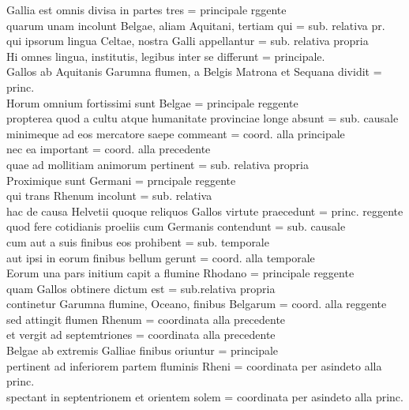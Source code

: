 \documentclass[10pt,a4paper]{article}
\begin{document}
	Gallia est omnis divisa in partes tres = principale rggente \\
	quarum unam incolunt Belgae, aliam Aquitani, tertiam qui = sub. relativa pr.\\
	qui ipsorum lingua Celtae, nostra Galli appellantur = sub. relativa propria\\
	Hi omnes lingua, institutis, legibus inter se differunt = principale.\\
	Gallos ab Aquitanis Garumna flumen, a Belgis Matrona et Sequana dividit = princ. \\
	Horum omnium fortissimi sunt Belgae = principale reggente\\
	propterea quod a cultu atque humanitate provinciae longe absunt = sub. causale\\
	minimeque ad eos mercatore saepe commeant = coord. alla principale\\
	nec ea important = coord. alla precedente\\
	quae ad mollitiam animorum pertinent = sub. relativa propria\\
	Proximique sunt Germani = prncipale reggente\\
	qui trans Rhenum incolunt = sub. relativa\\
	hac de causa Helvetii quoque reliquos Gallos virtute praecedunt = princ. reggente\\
	quod fere cotidianis proeliis cum Germanis contendunt = sub. causale\\
	cum aut a suis finibus eos prohibent = sub. temporale\\
	aut ipsi in eorum finibus bellum gerunt = coord. alla temporale\\
	Eorum una pars initium capit a flumine Rhodano = principale reggente\\
	quam Gallos obtinere dictum est = sub.relativa propria\\
	continetur Garumna flumine, Oceano, finibus Belgarum = coord. alla reggente\\
	sed attingit flumen Rhenum = coordinata alla precedente\\
	et vergit ad septemtriones = coordinata alla precedente\\
	Belgae ab extremis Galliae finibus oriuntur = principale\\
	pertinent ad inferiorem partem fluminis Rheni = coordinata per asindeto alla princ.\\
	spectant in septentrionem et orientem solem = coordinata per asindeto alla princ.\\
\end{document}
